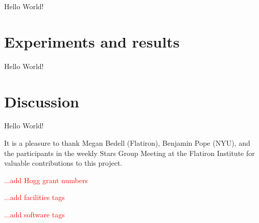 \documentclass[modern]{aastex62}
\newcommand{\todo}[1]{\textcolor{red}{#1}}  %
\begin{document}
Hello World!

\section{Experiments and results}

Hello World!

\section{Discussion}

Hello World!

\acknowledgements
It is a pleasure to thank
  Megan Bedell (Flatiron),
  Benjamin Pope (NYU),
and the participants in the weekly Stars Group Meeting at the Flatiron
Institute for valuable contributions to this project.

\todo{...add Hogg grant numbers}

\todo{...add facilities tags}

\todo{...add software tags}


\end{document}
